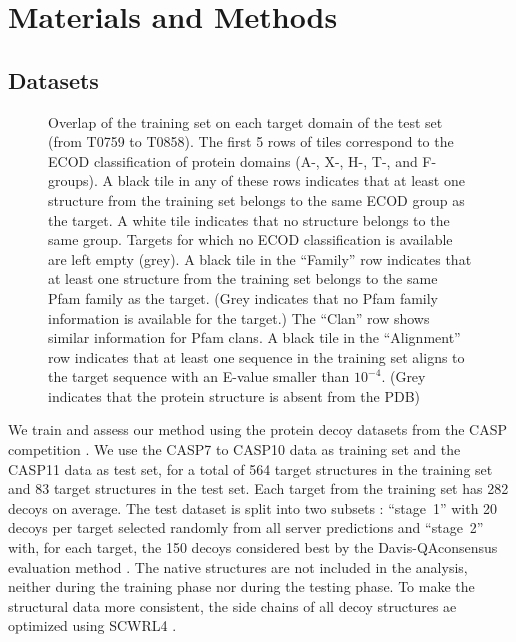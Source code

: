 \documentclass{bioinfo}
\begin{document}
\section{Materials and Methods}

\subsection{Datasets}

\begin{figure}[t]
    \caption{Overlap of the training set on each target domain of the
    test set (from T0759 to T0858). The first 5 rows of tiles
    correspond to the ECOD classification of protein domains (A-, X-,
    H-, T-, and F-groups). A black tile in any of these rows indicates
    that at least one structure from the training set belongs to the
    same ECOD group as the target. A white tile indicates that no
    structure belongs to the same group. Targets for which no ECOD
    classification is available are left empty (grey).
    A black tile in the ``Family'' row indicates that at least one
    structure from the training set belongs to the same Pfam family as
    the target. (Grey indicates that no Pfam family information is
    available for the target.) The ``Clan'' row shows similar
    information for Pfam clans. A black tile in the ``Alignment'' row
    indicates that at least one sequence in the training set aligns to
    the target sequence with an E-value smaller than $10^{-4}$. (Grey
    indicates that the protein structure is absent from the PDB)}
    \label{Fig:summaryTable}
\end{figure}

We train and assess our method using the protein decoy datasets from
the CASP competition \citep{moult2014critical}.  We use the CASP7 to
CASP10 data as training set and the CASP11 data as test set, for a
total of 564 target structures in the training set and 83 target
structures in the test set. Each target from the training set has 282
decoys on average.
The test dataset is split into two subsets \citep{kryshtafovych2015}:
``stage~1'' with 20 decoys per target selected randomly from all
server predictions and ``stage~2'' with, for each target, the 150 decoys
considered best by the Davis-QAconsensus evaluation
method \citep{kryshtafovych2015}.
The native structures are not included in the analysis, neither
during the training phase nor during the testing phase. To make the
structural data more consistent, the side chains of all decoy
structures ae optimized using SCWRL4
\citep{krivov2009improved}.
\end{document}
